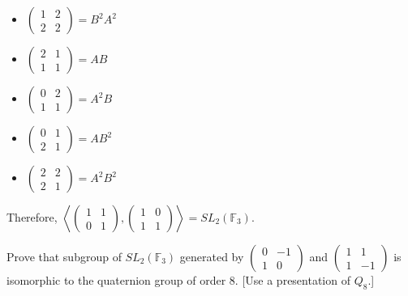 \begin{solution}
\begin{multicols}{3}
\begin{itemize}
            \item $\begin{pmatrix} 1 & 2\\ 2 & 2 \end{pmatrix} = B^2 A^2$
            \item $\begin{pmatrix} 2 & 1\\ 1 & 1 \end{pmatrix} = AB$
            \item $\begin{pmatrix} 0 & 2\\ 1 & 1 \end{pmatrix} = A^2 B$
            \item $\begin{pmatrix} 0 & 1\\ 2 & 1 \end{pmatrix} = A B^2$
            \item $\begin{pmatrix} 2 & 2\\ 2 & 1 \end{pmatrix} = A^2 B^2$
        \end{itemize}
        \end{multicols}
        \noindent Therefore, $\left<  \begin{pmatrix} 1 & 1\\ 0 & 1 \end{pmatrix}, \begin{pmatrix} 1 & 0\\ 1 & 1 \end{pmatrix} \right> = SL_2(\mathbb{F}_3)$. \\
\end{solution}

\begin{exercise}
    Prove that subgroup of $SL_2(\mathbb{F}_3)$ generated by $\begin{pmatrix} 0 & -1\\ 1 & 0 \end{pmatrix}$ and $\begin{pmatrix} 1 & 1\\ 1 & -1 \end{pmatrix}$ is isomorphic to the quaternion group of order 8. [Use a presentation of $Q_8$.]\\
\end{exercise}

